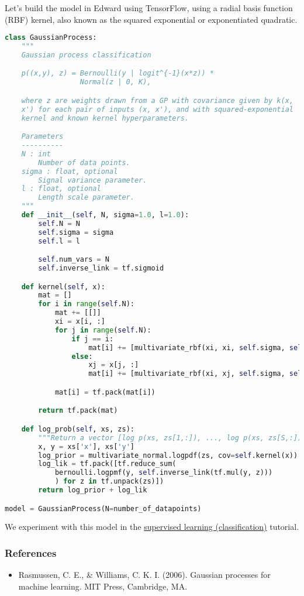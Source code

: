 Let's build the model in Edward using TensorFlow, using a radial basis function 
(RBF) kernel, also known as the squared exponential or exponentiated quadratic.
\begin{lstlisting}[language=Python]
class GaussianProcess:
    """
    Gaussian process classification

    p((x,y), z) = Bernoulli(y | logit^{-1}(x*z)) *
                  Normal(z | 0, K),

    where z are weights drawn from a GP with covariance given by k(x,
    x') for each pair of inputs (x, x'), and with squared-exponential
    kernel and known kernel hyperparameters.

    Parameters
    ----------
    N : int
        Number of data points.
    sigma : float, optional
        Signal variance parameter.
    l : float, optional
        Length scale parameter.
    """
    def __init__(self, N, sigma=1.0, l=1.0):
        self.N = N
        self.sigma = sigma
        self.l = l

        self.num_vars = N
        self.inverse_link = tf.sigmoid

    def kernel(self, x):
        mat = []
        for i in range(self.N):
            mat += [[]]
            xi = x[i, :]
            for j in range(self.N):
                if j == i:
                    mat[i] += [multivariate_rbf(xi, xi, self.sigma, self.l)]
                else:
                    xj = x[j, :]
                    mat[i] += [multivariate_rbf(xi, xj, self.sigma, self.l)]

            mat[i] = tf.pack(mat[i])

        return tf.pack(mat)

    def log_prob(self, xs, zs):
        """Return a vector [log p(xs, zs[1,:]), ..., log p(xs, zs[S,:])]."""
        x, y = xs['x'], xs['y']
        log_prior = multivariate_normal.logpdf(zs, cov=self.kernel(x))
        log_lik = tf.pack([tf.reduce_sum(
            bernoulli.logpmf(y, self.inverse_link(tf.mul(y, z)))
            ) for z in tf.unpack(zs)])
        return log_prior + log_lik

model = GaussianProcess(N=number_of_datapoints)
\end{lstlisting}

We experiment with this model in the
\href{tut_supervised_classification.html}{supervised learning (classification)} tutorial.

\subsubsection{References}\label{references}

\begin{itemize}
\item
  Rasmussen, C. E., \& Williams, C. K. I. (2006). Gaussian processes
  for machine learning. MIT Press, Cambridge, MA.
\end{itemize}
